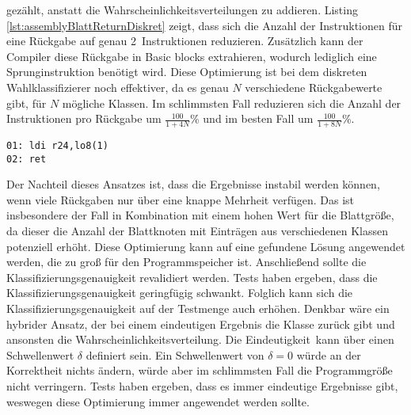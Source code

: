 gezählt, anstatt die Wahrscheinlichkeitsverteilungen zu addieren. Listing \ref{lst:assemblyBlattReturnDiskret} zeigt, dass sich die Anzahl der Instruktionen für eine Rückgabe auf genau 2~Instruktionen
reduzieren. Zusätzlich kann der Compiler diese Rückgabe in Basic blocks extrahieren, wodurch lediglich eine Sprunginstruktion benötigt wird. Diese Optimierung ist bei dem diskreten Wahlklassifizierer noch
effektiver, da es genau $N$ verschiedene Rückgabewerte gibt, für $N$ mögliche Klassen. Im schlimmsten Fall reduzieren sich die Anzahl der Instruktionen pro Rückgabe um $\frac{100}{1 + 4N}$\%
und im besten Fall um $\frac{100}{1 + 8N}$\%.
\begin{lstlisting}[label=lst:assemblyBlattReturnDiskret,caption={Beispiel des Assemblycodes der Rückgabe eines diskreten Wahlklassifizierers.}]
01: ldi r24,lo8(1)
02: ret
\end{lstlisting}
Der Nachteil dieses Ansatzes ist, dass die Ergebnisse instabil werden können, wenn viele Rückgaben nur über eine knappe Mehrheit verfügen. Das ist insbesondere der Fall in Kombination mit einem hohen Wert
für die Blattgröße, da dieser die Anzahl der Blattknoten mit Einträgen aus verschiedenen Klassen potenziell erhöht. Diese Optimierung kann auf eine gefundene Lösung angewendet werden, die zu groß für den
Programmspeicher ist. Anschließend sollte die Klassifizierungsgenauigkeit revalidiert werden. Tests haben ergeben, dass die Klassifizierungsgenauigkeit geringfügig schwankt. Folglich kann sich die
Klassifizierungsgenauigkeit auf der Testmenge auch erhöhen.
\newline
\newline
Denkbar wäre ein hybrider Ansatz, der bei einem eindeutigen Ergebnis die Klasse zurück gibt und ansonsten die Wahrscheinlichkeitsverteilung. Die \glqq Eindeutigkeit\grqq\ kann über
einen Schwellenwert $\delta$ definiert sein. Ein Schwellenwert von $\delta=0$ würde an der Korrektheit nichts ändern, würde aber im schlimmsten Fall die Programmgröße nicht verringern.
Tests haben ergeben, dass es immer eindeutige Ergebnisse gibt, weswegen diese Optimierung immer angewendet werden sollte.